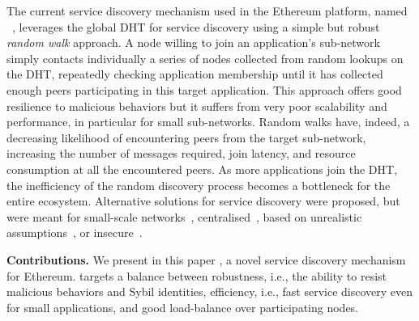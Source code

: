 
The current service discovery mechanism used in the Ethereum platform, named \discv~\cite{discv4}, leverages the global DHT for service discovery using a simple but robust \emph{random walk} approach.
A node willing to join an application's sub-network simply contacts individually a series of nodes collected from random lookups on the DHT, repeatedly checking application membership until it has collected enough peers participating in this target application.
This approach offers good resilience to malicious behaviors but it suffers from very poor scalability and performance, in particular for small sub-networks.
Random walks have, indeed, a decreasing likelihood of encountering peers from the target sub-network, increasing the number of messages required, join latency, and resource consumption at all the encountered peers.
As more applications join the DHT, the inefficiency of the random discovery process becomes a bottleneck for the entire ecosystem.
Alternative solutions for service discovery were proposed, but were meant for small-scale networks~\cite{zhang2002aggregate, helal2002standards}, centralised~\cite{RFC6763}, based on unrealistic assumptions~\cite{danezis2005sybil, danezis2009sybilinfer}, or insecure~\cite{baldoni2007tera,scribe,poldercast,banno2015,scribe}.

\smallskip
\noindent
\textbf{Contributions.}
%
We present in this paper \sysname, a novel service discovery mechanism for Ethereum.
\sysname targets a balance between robustness, i.e., the ability to resist malicious behaviors and Sybil identities, efficiency, i.e., fast service discovery even for small applications, and good load-balance over participating nodes.

